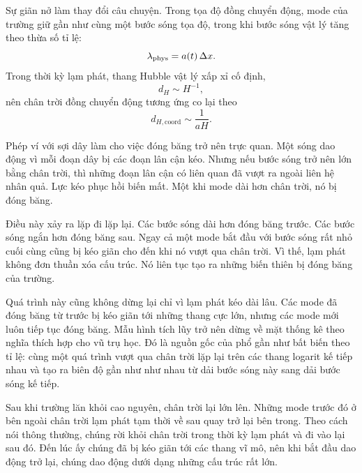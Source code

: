 Sự giãn nở làm thay đổi câu chuyện. Trong tọa độ đồng chuyển động, mode của trường giữ gần như cùng một bước sóng tọa độ, trong khi bước sóng vật lý tăng theo thừa số tỉ lệ:
\begin{equation}
\lambda_{\rm phys}=a(t)\,\Delta x.
\end{equation}
Trong thời kỳ lạm phát, thang Hubble vật lý xấp xỉ cố định,
\begin{equation}
d_H\sim H^{-1},
\end{equation}
nên chân trời đồng chuyển động tương ứng co lại theo
\begin{equation}
d_{H,\mathrm{coord}}\sim \frac{1}{aH}.
\end{equation}

Phép ví với sợi dây làm cho việc đóng băng trở nên trực quan. Một sóng dao động vì mỗi đoạn dây bị các đoạn lân cận kéo. Nhưng nếu bước sóng trở nên lớn bằng chân trời, thì những đoạn lân cận có liên quan đã vượt ra ngoài liên hệ nhân quả. Lực kéo phục hồi biến mất. Một khi mode dài hơn chân trời, nó bị đóng băng.

Điều này xảy ra lặp đi lặp lại. Các bước sóng dài hơn đóng băng trước. Các bước sóng ngắn hơn đóng băng sau. Ngay cả một mode bắt đầu với bước sóng rất nhỏ cuối cùng cũng bị kéo giãn cho đến khi nó vượt qua chân trời. Vì thế, lạm phát không đơn thuần xóa cấu trúc. Nó liên tục tạo ra những biến thiên bị đóng băng của trường.

Quá trình này cũng không dừng lại chỉ vì lạm phát kéo dài lâu. Các mode đã đóng băng từ trước bị kéo giãn tới những thang cực lớn, nhưng các mode mới luôn tiếp tục đóng băng. Mẫu hình tích lũy trở nên dừng về mặt thống kê theo nghĩa thích hợp cho vũ trụ học. Đó là nguồn gốc của phổ gần như bất biến theo tỉ lệ: cùng một quá trình vượt qua chân trời lặp lại trên các thang logarit kế tiếp nhau và tạo ra biên độ gần như như nhau từ dải bước sóng này sang dải bước sóng kế tiếp.

Sau khi trường lăn khỏi cao nguyên, chân trời lại lớn lên. Những mode trước đó ở bên ngoài chân trời lạm phát tạm thời về sau quay trở lại bên trong. Theo cách nói thông thường, chúng rời khỏi chân trời trong thời kỳ lạm phát và đi vào lại sau đó. Đến lúc ấy chúng đã bị kéo giãn tới các thang vĩ mô, nên khi bắt đầu dao động trở lại, chúng dao động dưới dạng những cấu trúc rất lớn.

\begin{classroomqa}
\end{classroomqa}

